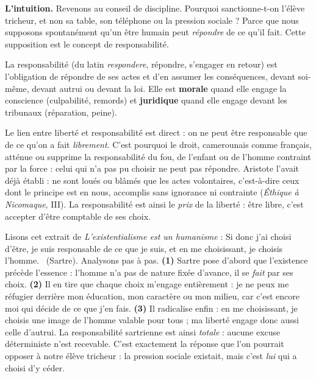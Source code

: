 \documentclass[11pt]{article}
\newcommand{\cle}[1]{{\popxbold\color{popdark}#1}}
\newcounter{popsec}
\newcounter{popsub}
\newcommand{\courssub}[1]{%
  \stepcounter{popsub}%
  \par\vspace{9pt}\noindent{\popxbold\fontsize{11.5}{13}\selectfont\color{popink}{\color{poporange}\thepopsec.\thepopsub}\hspace{6pt}#1}\par\nopagebreak\vspace{4pt}
}
\begin{document}
\courssub{La responsabilité : répondre de ses actes}

\textbf{L'intuition.} Revenons au conseil de discipline. Pourquoi sanctionne-t-on l'élève tricheur, et non sa table, son téléphone ou \guillemotleft la pression sociale \guillemotright ? Parce que nous supposons spontanément qu'un être humain peut \emph{répondre} de ce qu'il fait. Cette supposition est le concept de \cle{responsabilité}.

\begin{definition}[La responsabilité]
La \cle{responsabilité} (du latin \emph{respondere}, répondre, s'engager en retour) est l'obligation de répondre de ses actes et d'en assumer les conséquences, devant soi-même, devant autrui ou devant la loi. Elle est \textbf{morale} quand elle engage la conscience (culpabilité, remords) et \textbf{juridique} quand elle engage devant les tribunaux (réparation, peine).
\end{definition}

Le lien entre liberté et responsabilité est direct : on ne peut être responsable que de ce qu'on a fait \emph{librement}. C'est pourquoi le droit, camerounais comme français, atténue ou supprime la responsabilité du fou, de l'enfant ou de l'homme contraint par la force : celui qui n'a pas pu choisir ne peut pas répondre. Aristote l'avait déjà établi : ne sont loués ou blâmés que les actes volontaires, c'est-à-dire ceux dont le principe est en nous, accomplis sans ignorance ni contrainte (\emph{Éthique à Nicomaque}, III). La responsabilité est ainsi le \emph{prix} de la liberté : être libre, c'est accepter d'être comptable de ses choix.

\begin{experience}
Lisons cet extrait de \emph{L'existentialisme est un humanisme} : \guillemotleft Si donc j'ai choisi d'être, je suis responsable de ce que je suis, et en me choisissant, je choisis l'homme. \guillemotright\ (Sartre). Analysons pas à pas. \textbf{(1)} Sartre pose d'abord que l'existence précède l'essence : l'homme n'a pas de nature fixée d'avance, il se \emph{fait} par ses choix. \textbf{(2)} Il en tire que chaque choix m'engage entièrement : je ne peux me réfugier derrière mon éducation, mon caractère ou mon milieu, car c'est encore moi qui décide de ce que j'en fais. \textbf{(3)} Il radicalise enfin : en me choisissant, je choisis une image de l'homme valable pour tous ; ma liberté engage donc aussi celle d'autrui. La responsabilité sartrienne est ainsi \emph{totale} : aucune excuse déterministe n'est recevable. C'est exactement la réponse que l'on pourrait opposer à notre élève tricheur : la pression sociale existait, mais c'est \emph{lui} qui a choisi d'y céder.
\end{experience}
\end{document}
